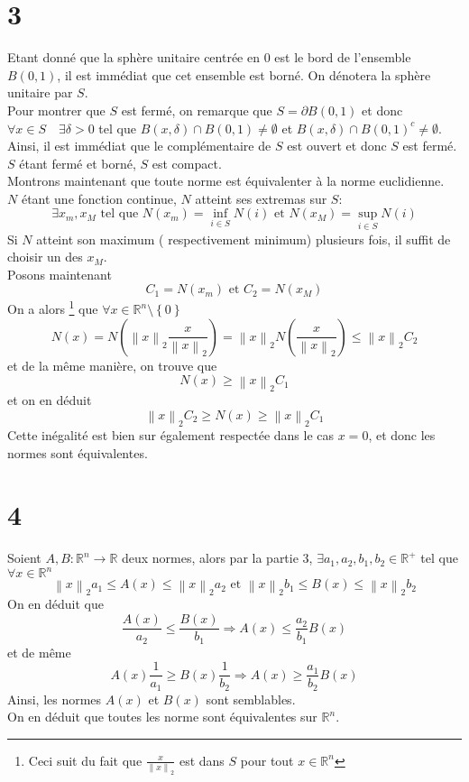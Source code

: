 \documentclass[11pt, a4paper, twoside]{article}
\newcommand\N[1]{\left\lVert#1\right\rVert_2}
\begin{document}
\section*{3}
Etant donné que la sphère unitaire centrée en $0$ est le bord de l'ensemble $ B( 0,1) $, il est immédiat que cet ensemble est borné. On dénotera la sphère unitaire par $S$.\\
Pour montrer que $S$ est fermé, on remarque que $S = \partial B( 0,1) $ et donc $\forall x \in S\quad \exists \delta >0 $ tel que $B( x,\delta) \cap B( 0,1)  \neq \emptyset$ et $B( x,\delta) \cap B( 0,1) ^{c} \neq \emptyset$.\\
Ainsi, il est immédiat que le complémentaire de $S$ est ouvert et donc $S$ est fermé.\\
$S$ étant fermé et borné, $S$ est compact.\\
Montrons maintenant que toute norme est équivalenter à la norme euclidienne.\\
$N$ étant une fonction continue, $N $ atteint ses extremas sur $S$:
\[ 
	\exists x_m, x_M \text{ tel que } N( x_m) = \inf_{i \in S} N( i) \text{ et } N( x_M) = \sup_{i \in S} N(i)
\]
Si $N$ atteint son maximum ( respectivement minimum)  plusieurs fois, il suffit de choisir un des $x_M$.\\
Posons maintenant
\[ 
	C_1= N( x_m)  \text{ et } C_2= N( x_M) 
\]
On a alors \footnote { Ceci suit du fait que $\frac{x}{\N{x}}$ est dans $S$ pour tout $x \in \mathbb{R}^n$	  }  que $\forall x \in \mathbb{R}^n\setminus \left\{ 0 \right\} $
\[ 
	N ( x)  = N( \N { x} \frac{x}{\N { x} }) = \N { x}  N( \frac{x}{\N{x}}) \leq \N{x} C_2
\]
et de la même manière, on trouve que
\[ 
	N( x) \geq \N { x} C_1
\]
et on en déduit 
\[ 
	\N  { x} C_2\geq N( x) \geq \N { x} C_1
\]
Cette inégalité est bien sur également respectée dans le cas $x=0$, et donc les normes sont équivalentes.

\section*{4}
Soient $A, B: \mathbb{R}^n\to \mathbb{R}$ deux normes, alors par la partie 3, $\exists a_1, a_2, b_1,b_2 \in \mathbb{R}^{+}$ tel que $\forall x \in \mathbb{R}^n$
\[ 
	\N { x} a_1 \leq A( x) \leq \N { x} a_2 \text{ et } \N { x} b_1 \leq B( x) \leq \N { x} b_2
\]
On en déduit que 
\[ 
	\frac{ A(x)}{a_2} \leq \frac {  B( x)} { b_1} \Rightarrow A( x) \leq \frac{a_2}{b_1} B( x) 
\]
et de même
\[ 
	A( x) \frac{1}{a_1}\geq B( x) \frac{1}{b_2} \Rightarrow A( x)  \geq \frac{a_1}{b_2}	B( x) 
\]
Ainsi, les normes $A( x) $ et $B(x) $ sont semblables.\\
On en déduit que toutes les norme sont équivalentes sur $ \mathbb{R}^n$.
\end{document}
